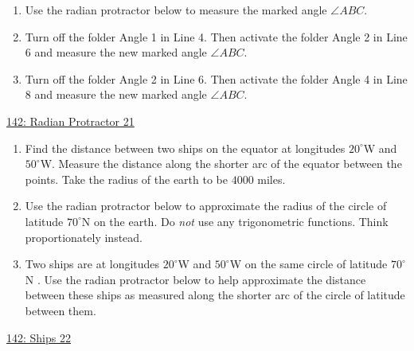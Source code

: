 \documentclass{ximera}
\begin{document}
\begin{question} \label{Q5fggtg4t4tggdet4}
\begin{enumerate}
\item Use the radian protractor below to measure the marked angle $\angle ABC$.

\item Turn off the folder Angle 1 in Line 4. Then activate the folder Angle 2 in Line 6 and measure the new marked angle $\angle ABC$.

\item Turn off the folder Angle 2 in Line 6. Then activate the folder Angle 4 in Line 8 and measure the new marked angle $\angle ABC$.

\end{enumerate}

\begin{onlineOnly}
    \begin{center}
\end{center}
\end{onlineOnly}

\href{https://www.desmos.com/calculator/dqedbpsohm}{142: Radian Protractor 21}
\end{question}


\begin{question} \label{QPPPdfrrr3r54g}

\begin{enumerate}
\item Find the distance between two ships on the equator at longitudes $20^\circ$W and $50^\circ$W. Measure the distance along the shorter arc of the equator between the points. Take the radius of the earth to be $4000$ miles.

\item Use the radian protractor below to approximate the radius of the circle of latitude $70^\circ$N on the earth. Do \emph{not} use any trigonometric functions. Think proportionately instead.

\item Two ships are at longitudes $20^\circ$W and $50^\circ$W on the same circle of latitude $70^\circ$N . Use the radian protractor below to help approximate the distance between these ships as measured along the shorter arc of the circle of latitude between them.
 
 
\end{enumerate}

\begin{onlineOnly}
    \begin{center}
\end{center}

\href{https://www.desmos.com/calculator/fmjbqszyge}{142: Ships 22}

\end{onlineOnly}
\end{question}
\end{document}
